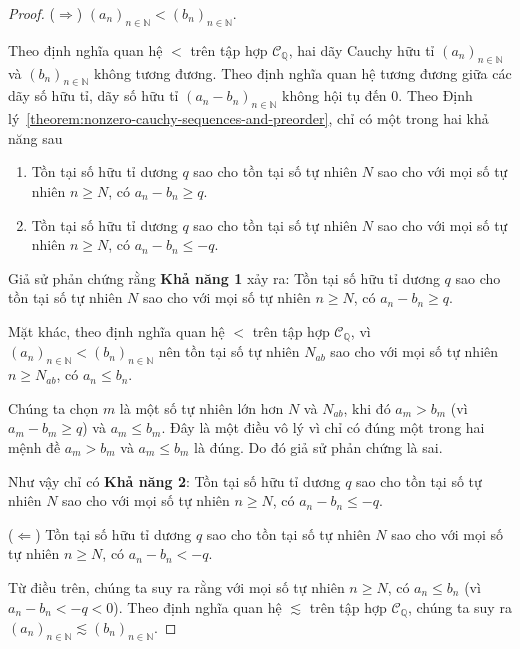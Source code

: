 \begin{proof}
    ($\Rightarrow$) ${(a_{n})}_{n\in\mathbb{N}} < {(b_{n})}_{n\in\mathbb{N}}$.

    Theo định nghĩa quan hệ $<$ trên tập hợp $\mathscr{C}_{\mathbb{Q}}$, hai dãy Cauchy hữu tỉ ${(a_{n})}_{n\in\mathbb{N}}$ và ${(b_{n})}_{n\in\mathbb{N}}$ không tương đương. Theo định nghĩa quan hệ tương đương giữa các dãy số hữu tỉ, dãy số hữu tỉ ${(a_{n} - b_{n})}_{n\in\mathbb{N}}$ không hội tụ đến $0$. Theo Định lý~\ref{theorem:nonzero-cauchy-sequences-and-preorder}, chỉ có một trong hai khả năng sau
    \begin{enumerate}[label={\textbf{Khả năng \arabic*.}},itemindent=2cm]
        \item Tồn tại số hữu tỉ dương $q$ sao cho tồn tại số tự nhiên $N$ sao cho với mọi số tự nhiên $n\geq N$, có $a_{n} - b_{n}\geq q$.
        \item Tồn tại số hữu tỉ dương $q$ sao cho tồn tại số tự nhiên $N$ sao cho với mọi số tự nhiên $n\geq N$, có $a_{n} - b_{n}\leq -q$.
    \end{enumerate}

    Giả sử phản chứng rằng \textbf{Khả năng 1} xảy ra: Tồn tại số hữu tỉ dương $q$ sao cho tồn tại số tự nhiên $N$ sao cho với mọi số tự nhiên $n\geq N$, có $a_{n} - b_{n}\geq q$.

    Mặt khác, theo định nghĩa quan hệ $<$ trên tập hợp $\mathscr{C}_{\mathbb{Q}}$, vì ${(a_{n})}_{n\in\mathbb{N}} < {(b_{n})}_{n\in\mathbb{N}}$ nên tồn tại số tự nhiên $N_{ab}$ sao cho với mọi số tự nhiên $n\geq N_{ab}$, có $a_{n}\leq b_{n}$.

    Chúng ta chọn $m$ là một số tự nhiên lớn hơn $N$ và $N_{ab}$, khi đó $a_{m} > b_{m}$ (vì $a_{m} - b_{m}\geq q$) và $a_{m}\leq b_{m}$. Đây là một điều vô lý vì chỉ có đúng một trong hai mệnh đề $a_{m} > b_{m}$ và $a_{m}\leq b_{m}$ là đúng. Do đó giả sử phản chứng là sai.

    Như vậy chỉ có \textbf{Khả năng 2}: Tồn tại số hữu tỉ dương $q$ sao cho tồn tại số tự nhiên $N$ sao cho với mọi số tự nhiên $n\geq N$, có $a_{n} - b_{n}\leq -q$.

    \bigskip

    ($\Leftarrow$) Tồn tại số hữu tỉ dương $q$ sao cho tồn tại số tự nhiên $N$ sao cho với mọi số tự nhiên $n\geq N$, có $a_{n} - b_{n} < -q$.

    Từ điều trên, chúng ta suy ra rằng với mọi số tự nhiên $n\geq N$, có $a_{n}\leq b_{n}$ (vì $a_{n} - b_{n} < -q < 0$). Theo định nghĩa quan hệ $\lesssim$ trên tập hợp $\mathscr{C}_{\mathbb{Q}}$, chúng ta suy ra ${(a_{n})}_{n\in\mathbb{N}}\lesssim {(b_{n})}_{n\in\mathbb{N}}$.


\end{proof}
